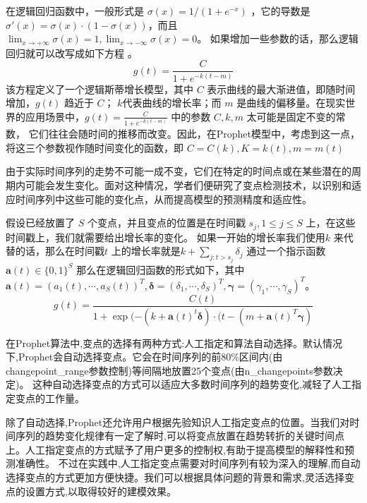 在逻辑回归函数中，一般形式是 $\sigma(x) = 1/(1+e^{-x})$ ，它的导数是 $\sigma'(x) = \sigma(x) \cdot(1-\sigma(x))$，而且$\lim_{x\rightarrow +\infty} \sigma(x) = 1, \lim_{x\rightarrow -\infty} \sigma(x) = 0$。
如果增加一些参数的话，那么逻辑回归就可以改写成如下方程\cite{李威2021Prophet模型在GNSS坐标时间序列中的插值分析} 。
\begin{equation}
	g(t) = \frac{C}{1 + e^{-k(t - m)}}
\end{equation}
该方程定义了一个逻辑斯蒂增长模型，其中 $C$ 表示曲线的最大渐进值，即随时间增加，$g(t)$ 趋近于 $C$；
$k$代表曲线的增长率；而 $m$ 是曲线的偏移量。在现实世界的应用场景中，$g(t) = \frac{C}{1 + e^{-k(t - m)}}$ 中的参数 $C, k, m$ 太可能是固定不变的常数，
它们往往会随时间的推移而改变。因此，在Prophet模型中，考虑到这一点，将这三个参数视作随时间变化的函数，即 $ C = C(k), K = k(t), m = m(t)$

由于实际时间序列的走势不可能一成不变，它们在特定的时间点或在某些潜在的周期内可能会发生变化。面对这种情况，学者们便研究了变点检测技术，以识别和适应时间序列中这些可能的变化点，从而提高模型的预测精度和适应性。

假设已经放置了 $S$ 个变点，并且变点的位置是在时间戳 $s_{j}, 1\leq j\leq S$ 上，在这些时间戳上，我们就需要给出增长率的变化。
如果一开始的增长率我们使用$k$ 来代替的话，那么在时间戳$t$ 上的增长率就是$k + \sum_{j:t>s_{j}} \delta_{j}$ 通过一个指示函数 $\mathbf{a}(t)\in \{0,1\}^{S}$
那么在逻辑回归函数的形式如下，其中 $\mathbf{a}(t) = (a_{1}(t),\cdots,a_{S}(t))^{T},  \mathbf{\delta} = (\delta_{1},\cdots,\delta_{S})^{T}, \mathbf{\gamma} = (\gamma_{1},\cdots,\gamma_{S})^{T}$。
\begin{equation}
	g(t) = \frac{C(t)}{1+\exp(-(k+\mathbf{a}(t)^{t}\mathbf{\delta}) \cdot (t - (m+\mathbf{a}(t)^{T}\mathbf{\gamma})}
\end{equation}

在Prophet算法中,变点的选择有两种方式:人工指定和算法自动选择。默认情况下,Prophet会自动选择变点。它会在时间序列的前80\%区间内(由changepoint\_range参数控制)等间隔地放置25个变点(由n\_changepoints参数决定)。
这种自动选择变点的方式可以适应大多数时间序列的趋势变化,减轻了人工指定变点的工作量。

除了自动选择,Prophet还允许用户根据先验知识人工指定变点的位置。当我们对时间序列的趋势变化规律有一定了解时,可以将变点放置在趋势转折的关键时间点上。人工指定变点的方式赋予了用户更多的控制权,有助于提高模型的解释性和预测准确性。
不过在实践中,人工指定变点需要对时间序列有较为深入的理解,而自动选择变点的方式更加方便快捷。我们可以根据具体问题的背景和需求,灵活选择变点的设置方式,以取得较好的建模效果。

